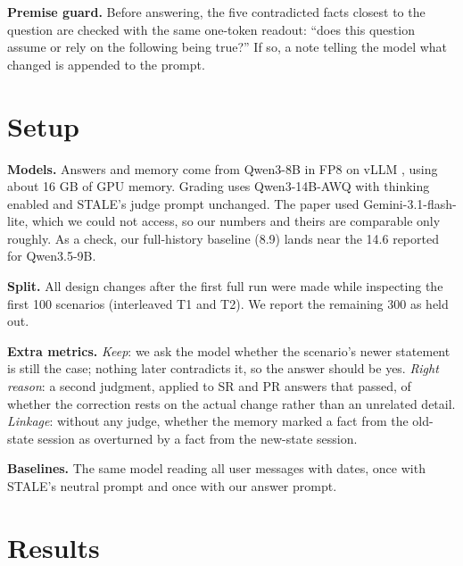 \documentclass[10pt,twocolumn]{article}
\begin{document}
\textbf{Premise guard.} Before answering, the five contradicted facts closest to the question are checked with the
same one-token readout: ``does this question assume or rely on the following being true?'' If so, a note telling the
model what changed is appended to the prompt.

\section{Setup}

\textbf{Models.} Answers and memory come from Qwen3-8B \cite{qwen3} in FP8 on vLLM \cite{vllm}, using about 16 GB of
GPU memory. Grading uses Qwen3-14B-AWQ with thinking enabled and STALE's judge prompt unchanged. The paper used
Gemini-3.1-flash-lite, which we could not access, so our numbers and theirs are comparable only roughly. As a check,
our full-history baseline (8.9) lands near the 14.6 reported for Qwen3.5-9B.

\textbf{Split.} All design changes after the first full run were made while inspecting the first 100 scenarios
(interleaved T1 and T2). We report the remaining 300 as held out.

\textbf{Extra metrics.} \emph{Keep}: we ask the model whether the scenario's newer statement is still the case;
nothing later contradicts it, so the answer should be yes. \emph{Right reason}: a second judgment, applied to SR and PR
answers that passed, of whether the correction rests on the actual change rather than an unrelated detail.
\emph{Linkage}: without any judge, whether the memory marked a fact from the old-state session as overturned by a
fact from the new-state session.

\textbf{Baselines.} The same model reading all user messages with dates, once with STALE's neutral prompt and once
with our answer prompt.

\section{Results}
\end{document}
